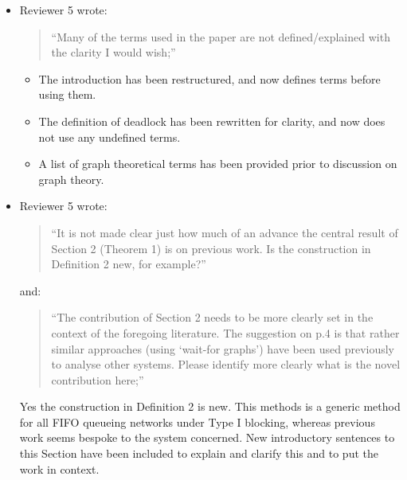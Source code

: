 \documentclass{article}
\begin{document}
\begin{itemize}

\item Reviewer 5 wrote:
\begin{quote}
``Many of the terms used in the paper are not defined/explained with the
clarity I would wish;''
\end{quote}
\begin{itemize}
\item The introduction has been restructured, and now defines terms before
using them.
\item The definition of deadlock has been rewritten for clarity, and now does
not use any undefined terms.
\item A list of graph theoretical terms has been provided prior to discussion
on graph theory.
\end{itemize}


\item Reviewer 5 wrote:
\begin{quote}
``It is not made clear just how much of an advance the central result of
Section 2 (Theorem 1) is on previous work.
Is the construction in Definition 2 new, for example?''
\end{quote}

and:

\begin{quote}
``The contribution of Section 2 needs to be more clearly set in the context
of the foregoing literature.
The suggestion on p.4 is that rather similar approaches (using ‘wait-for
graphs’) have been used previously to analyse other systems.
Please identify more clearly what is the novel contribution here;''
\end{quote}

Yes the construction in Definition 2 is new.
This methods is a generic method for all FIFO queueing networks under Type I
blocking, whereas previous work seems bespoke to the system concerned.
New introductory sentences to this Section have been included to explain and
clarify this and to put the work in context.



\end{itemize}
\end{document}
